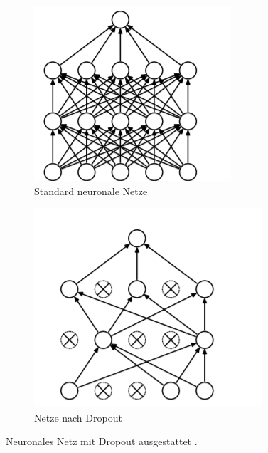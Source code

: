 \documentclass[12pt,a4paper]{scrartcl}
\numberwithin{equation}{section}
\begin{document}
	\begin{figure}[h]
	\begin{subfigure}{.5\textwidth}
		\centering
		\includegraphics[scale=2, width=.8\linewidth, height=\linewidth]{dropout1.png}
			\caption{Standard neuronale Netze}
		\label{fig:dropout1}
	\end{subfigure}%
	\begin{subfigure}{.5\textwidth}
		\centering
		\includegraphics[width=.8\linewidth, height=\linewidth, scale=2]{dropout2.png}
		\caption{Netze nach Dropout}
		\label{fig:dropout2}
	\end{subfigure}
	\caption{Neuronales Netz mit Dropout ausgestattet \cite{3}.}
	\label{fig:Dropout}
\end{figure}
\end{document}
